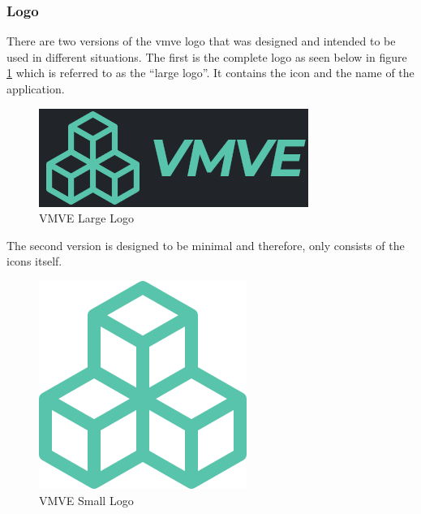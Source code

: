 \documentclass[11pt]{article}
\begin{document}
\subsubsection{Logo}
There are two versions of the \gls{vmve} logo that was designed and intended to
be used in different situations. The first is the complete logo as seen below in
figure \ref{fig:project_logo_large} which is referred to as the ``large logo''.
It contains the icon and the name of the application.
\begin{figure}[h!]
  \centering
  \includegraphics[width=\textwidth]{images/project_logo.png}
  \caption{VMVE Large Logo}
  \label{fig:project_logo_large}
\end{figure}

The second version is designed to be minimal and therefore, only consists of the
icons itself.

\begin{figure}[h!]
  \centering
  \includegraphics[width=\textwidth]{images/project_icon.png}
  \caption{VMVE Small Logo}
  \label{fig:project_logo_small}
\end{figure}
\end{document}
